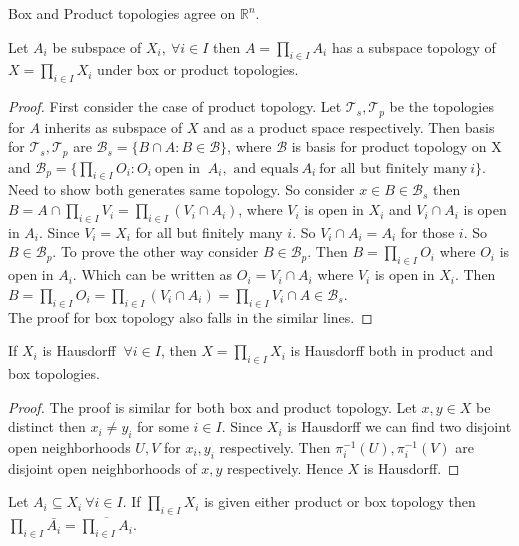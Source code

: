 \documentclass[a4paper,english,12pt]{article}   	%
\begin{document}
\begin{rem} Box and Product topologies agree on $\mathbb{R}^{n}$.
\end{rem}
\begin{thm}
Let $A_{i}$ be subspace of $X_{i},~ \forall i \in I$ then $A = \prod_{i \in I} A_{i}$ has a subspace topology of $X = \prod_{i \in I} X_{i}$ under box or product topologies. 
\end{thm}
\begin{proof}
First consider the case of product topology. Let $\mathcal{T}_{s},\mathcal{T}_{p}$ be the topologies for $A$ inherits as subspace of $X$ and as a product space respectively.
Then basis for $\mathcal{T}_{s},\mathcal{T}_{p}$ are $\mathcal{B}_{s} = \{ B \cap A \colon B \in \mathcal{B}\}$, where $\mathcal{B}$ is basis for product topology on X and $\mathcal{B}_{p} = \{\prod_{i \in I} O_{i} \colon O_{i} ~\text {open in } ~A_{i}, \text { and equals} ~A_{i} ~\text {for all but finitely many} ~i \}$. Need to show both generates same topology. So consider $x \in B \in \mathcal{B}_{s}$ then $B = A \cap \prod_{i \in I} V_{i} = \prod_{i \in I} (V_{i} \cap A_{i})$, where $V_{i}$ is open in $X_{i}$ and $V_{i} \cap A_{i}$ is open in $A_{i}$. Since $V_{i} = X_{i}$ for all but finitely many $i$. So $V_{i} \cap A_{i} = A_{i}$ for those $i$. So $B \in \mathcal{B}_{p}$. To prove the other way consider $B \in \mathcal{B}_{p}$. Then $B = \prod_{i \in I} O_{i}$ where $O_{i}$ is open in $A_{i}$. Which can be written as $O_{i} = V_{i} \cap A_{i}$ where $V_{i}$ is open in $X_{i}$. Then $B = \prod_{i \in I} O_{i} = \prod_{i \in I} (V_{i} \cap A_{i}) = \prod_{i \in I} V_{i} \cap A \in \mathcal{B}_{s}$.\\ The proof for box topology also falls  in the similar lines.
\end{proof}
\begin{thm}
If $X_{i}$ is Hausdorff $~\forall i \in I$, then $X = \prod_{i \in I} X_{i}$ is Hausdorff both in product and box topologies.
\end{thm}
\begin{proof}
The proof is similar  for both box and product topology. Let $x,y \in X$ be distinct then $x_{i} \neq y_{i}$ for some $i \in I$. Since $X_{i}$ is Hausdorff we can find two disjoint open neighborhoods $U,V$ for $x_{i},y_{i}$ respectively. Then $\pi_{i}^{-1}(U),\pi_{i}^{-1}(V)$ are disjoint open neighborhoods of $x,y$ respectively. Hence $X$ is Hausdorff.
\end{proof}
\begin{thm}
Let $A_{i} \subseteq X_{i} ~\forall i \in I$. If $\prod_{i \in I} X_{i}$ is given either product or box topology then $\prod_{i \in I} \bar{A_{i}} = \overline{\prod_{i \in I} A_{i}}$.
\end{thm}
\end{document}
